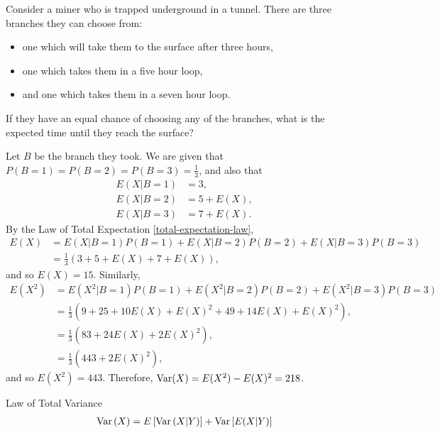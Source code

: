 \begin{exmp}
    Consider a miner who is trapped underground in a tunnel. There are three branches they can choose from:
    \begin{itemize}
        \item one which will take them to the surface after three hours,
        \item one which takes them in a five hour loop,
        \item and one which takes them in a seven hour loop.
    \end{itemize}
    If they have an equal chance of choosing any of the branches, what is the expected time until they reach the surface?

    Let $B$ be the branch they took. We are given that $P(B = 1) = P(B = 2) = P(B = 3) = \frac{1}{3}$, and also that
    \begin{align*}
        E(X|B=1) &= 3, \\
        E(X|B=2) &= 5 + E(X), \\
        E(X|B=3) &= 7 + E(X).
    \end{align*}
    By the Law of Total Expectation \ref{total-expectation-law},
    \begin{align*}
        E(X) &= E(X|B=1)P(B=1) + E(X|B=2)P(B=2) + E(X|B=3)P(B=3) \\
        &= \frac{1}{3}\left(3 + 5 + E(X) + 7 + E(X)\right),
    \end{align*}
    and so $E(X) = 15$. Similarly,
    \begin{align*}
        E(X^2) &= E(X^2|B=1)P(B=1) + E(X^2|B=2)P(B=2) + E(X^2|B=3)P(B=3) \\
        &= \frac{1}{3}\left(9 + 25 + 10E(X) + E(X)^2 + 49 + 14E(X) + E(X)^2\right), \\
        &= \frac{1}{3}\left(83 + 24E(X) + 2E(X)^2\right), \\
        &= \frac{1}{3}\left(443 + 2E(X)^2\right),
    \end{align*}
    and so $E(X^2) = 443$. Therefore, $\operatorname{Var}(X) = E(X^2) - E(X)^2 = 218$.
\end{exmp}

\begin{thm}{Law of Total Variance}\label{total-variance-law}
    \begin{align*}
        \operatorname{Var}\left(X\right) = E\left[\operatorname{Var}\left(X|Y\right)\right] + \operatorname{Var}\left[E(X|Y)\right]
    \end{align*}
\end{thm}

